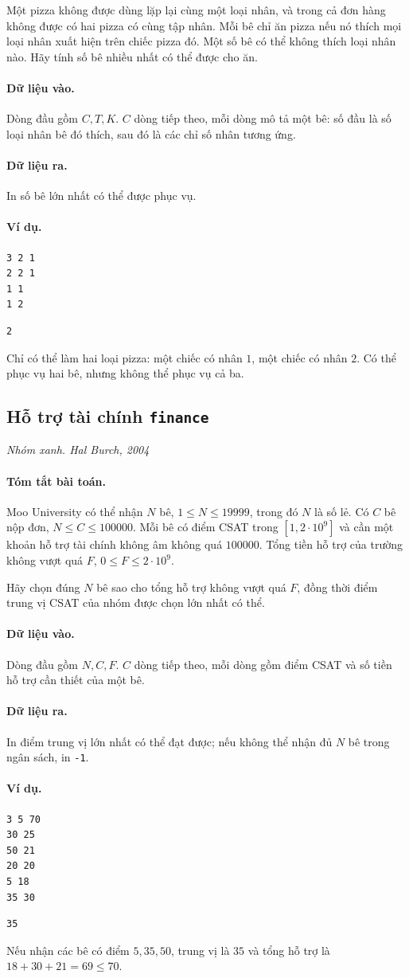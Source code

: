 \documentclass[11pt]{article}
\newcommand{\problem}[4]{%
  \subsection[#1 (#2)]{#1 \hfill {\normalsize\texttt{#2}}}%
  \noindent\textit{#3. #4}\par\smallskip
}
\newcommand{\iosec}[1]{\paragraph{#1}}
\begin{document}
Một pizza không được dùng lặp lại cùng một loại nhân, và trong cả đơn hàng
không được có hai pizza có cùng tập nhân. Mỗi bê chỉ ăn pizza nếu nó thích mọi
loại nhân xuất hiện trên chiếc pizza đó. Một số bê có thể không thích loại
nhân nào. Hãy tính số bê nhiều nhất có thể được cho ăn.

\iosec{Dữ liệu vào.}
Dòng đầu gồm \(C,T,K\). \(C\) dòng tiếp theo, mỗi dòng mô tả một bê: số đầu là
số loại nhân bê đó thích, sau đó là các chỉ số nhân tương ứng.

\iosec{Dữ liệu ra.}
In số bê lớn nhất có thể được phục vụ.

\iosec{Ví dụ.}
\begin{verbatim}
3 2 1
2 2 1
1 1
1 2
\end{verbatim}

\begin{verbatim}
2
\end{verbatim}

Chỉ có thể làm hai loại pizza: một chiếc có nhân \(1\), một chiếc có nhân
\(2\). Có thể phục vụ hai bê, nhưng không thể phục vụ cả ba.

\problem{Hỗ trợ tài chính}{finance}{Nhóm xanh}{Hal Burch, 2004}

\iosec{Tóm tắt bài toán.}
Moo University có thể nhận \(N\) bê, \(1\le N\le 19999\), trong đó \(N\) là số
lẻ. Có \(C\) bê nộp đơn, \(N\le C\le 100000\). Mỗi bê có điểm CSAT trong
\([1,2\cdot 10^9]\) và cần một khoản hỗ trợ tài chính không âm không quá
\(100000\). Tổng tiền hỗ trợ của trường không vượt quá \(F\),
\(0\le F\le 2\cdot 10^9\).

Hãy chọn đúng \(N\) bê sao cho tổng hỗ trợ không vượt quá \(F\), đồng thời
điểm trung vị CSAT của nhóm được chọn lớn nhất có thể.

\iosec{Dữ liệu vào.}
Dòng đầu gồm \(N,C,F\). \(C\) dòng tiếp theo, mỗi dòng gồm điểm CSAT và số tiền
hỗ trợ cần thiết của một bê.

\iosec{Dữ liệu ra.}
In điểm trung vị lớn nhất có thể đạt được; nếu không thể nhận đủ \(N\) bê trong
ngân sách, in \texttt{-1}.

\iosec{Ví dụ.}
\begin{verbatim}
3 5 70
30 25
50 21
20 20
5 18
35 30
\end{verbatim}

\begin{verbatim}
35
\end{verbatim}

Nếu nhận các bê có điểm \(5,35,50\), trung vị là \(35\) và tổng hỗ trợ là
\(18+30+21=69\le 70\).
\end{document}
